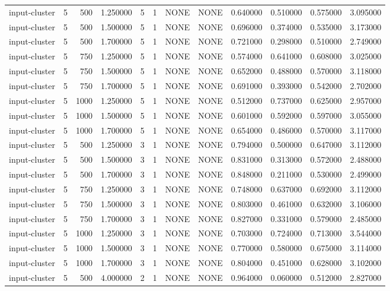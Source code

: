 \begin{tabular}{lrrrllllrrrr}
input-cluster & 5 & 500 & 1.250000 & 5 & 1 & NONE & NONE & 0.640000 & 0.510000 & 0.575000 & 3.095000 \\
input-cluster & 5 & 500 & 1.500000 & 5 & 1 & NONE & NONE & 0.696000 & 0.374000 & 0.535000 & 3.173000 \\
input-cluster & 5 & 500 & 1.700000 & 5 & 1 & NONE & NONE & 0.721000 & 0.298000 & 0.510000 & 2.749000 \\
input-cluster & 5 & 750 & 1.250000 & 5 & 1 & NONE & NONE & 0.574000 & 0.641000 & 0.608000 & 3.025000 \\
input-cluster & 5 & 750 & 1.500000 & 5 & 1 & NONE & NONE & 0.652000 & 0.488000 & 0.570000 & 3.118000 \\
input-cluster & 5 & 750 & 1.700000 & 5 & 1 & NONE & NONE & 0.691000 & 0.393000 & 0.542000 & 2.702000 \\
input-cluster & 5 & 1000 & 1.250000 & 5 & 1 & NONE & NONE & 0.512000 & 0.737000 & 0.625000 & 2.957000 \\
input-cluster & 5 & 1000 & 1.500000 & 5 & 1 & NONE & NONE & 0.601000 & 0.592000 & 0.597000 & 3.055000 \\
input-cluster & 5 & 1000 & 1.700000 & 5 & 1 & NONE & NONE & 0.654000 & 0.486000 & 0.570000 & 3.117000 \\
input-cluster & 5 & 500 & 1.250000 & 3 & 1 & NONE & NONE & 0.794000 & 0.500000 & 0.647000 & 3.112000 \\
input-cluster & 5 & 500 & 1.500000 & 3 & 1 & NONE & NONE & 0.831000 & 0.313000 & 0.572000 & 2.488000 \\
input-cluster & 5 & 500 & 1.700000 & 3 & 1 & NONE & NONE & 0.848000 & 0.211000 & 0.530000 & 2.499000 \\
input-cluster & 5 & 750 & 1.250000 & 3 & 1 & NONE & NONE & 0.748000 & 0.637000 & 0.692000 & 3.112000 \\
input-cluster & 5 & 750 & 1.500000 & 3 & 1 & NONE & NONE & 0.803000 & 0.461000 & 0.632000 & 3.106000 \\
input-cluster & 5 & 750 & 1.700000 & 3 & 1 & NONE & NONE & 0.827000 & 0.331000 & 0.579000 & 2.485000 \\
input-cluster & 5 & 1000 & 1.250000 & 3 & 1 & NONE & NONE & 0.703000 & 0.724000 & 0.713000 & 3.544000 \\
input-cluster & 5 & 1000 & 1.500000 & 3 & 1 & NONE & NONE & 0.770000 & 0.580000 & 0.675000 & 3.114000 \\
input-cluster & 5 & 1000 & 1.700000 & 3 & 1 & NONE & NONE & 0.804000 & 0.451000 & 0.628000 & 3.102000 \\
input-cluster & 5 & 500 & 4.000000 & 2 & 1 & NONE & NONE & 0.964000 & 0.060000 & 0.512000 & 2.827000 \\

\end{tabular}
